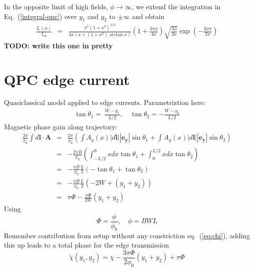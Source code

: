 In the opposite limit of high fields, $\phi\to \infty$, we extend the integration in Eq.~(\ref{integral-qpc}) over $y_1$ and $y_2$ to $\pm \infty$ and obtain
\begin{eqnarray}
\frac{I_c(\phi)}{I_{c0}} &=& \frac{\pi^2 \left(1+x^2\right)^{3/2}}{4x\left(x + \left(1+x^2\right)\arctan x\right)}\left(1 + \frac{3 \pi \phi }{4 x} \right) \sqrt{\frac{3 \phi}{2x}}\exp\left(-\frac{3\phi\pi}{2x}\right)
\label{large-phi}
\end{eqnarray}
\textbf{TODO: write this one in pretty}

\newpage
\section{QPC edge current}
Quasiclassical model applied to edge currents.
Parametriztion here:
\begin{eqnarray}
\tan \theta_1 = ~\frac{ W - y_1}{L/2}, \quad \tan \theta_2 = -\frac{W - y_2}{L/2}
\end{eqnarray}
Magnetic phase gain along trajectory:
\begin{eqnarray}
\frac{2 \pi}{\phi_0} \int d \mathbf{l} \cdot \mathbf{A} &=& \frac{2 \pi}{\phi_0} \left( \int A_y(x) |d\mathbf{l}| |\mathbf{e_y}| \sin \theta_1 + \int A_y(x) |d\mathbf{l}| |\mathbf{e_y}| \sin \theta_2  \right)\\
&=&  - \frac{2 \pi B}{\phi_0} \left( \int_{-L/2}^{0} x dx \tan \theta_1 + \int_{0}^{L/2} x dx \tan \theta_2 \right) \\
&=&  - \frac{\pi B}{\phi_0} \frac{L}{2} \left( - \tan \theta_1 + \tan \theta_2 \right) \\
&=& - \frac{\pi B}{\phi_0} \frac{L}{2} \left( -2W + (y_1 + y_2) \right)\\
&=& \pi \Phi -\frac{\pi \Phi }{2 W} (y_1 + y_2)  
\end{eqnarray}
Using
\begin{equation}
\Phi = \frac{\phi}{\phi_0}, \quad \phi = B W L
\end{equation}
Remember contribution from setup without any constriction eq.~(\ref{eq:chi}), adding this up leads to a total phase for the edge transmission
\begin{equation}
\tilde{\chi}(y_1, y_2) = \chi - \frac{3 \pi \Phi}{2\phi_0} (y_1 + y_2) + \pi \Phi 
\end{equation}



